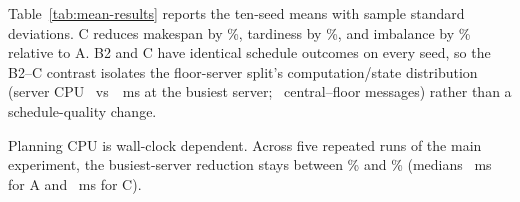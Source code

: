 Table~\ref{tab:mean-results} reports the ten-seed means with sample standard deviations. C reduces makespan by \RedMakespanCAabs\%, tardiness by \RedTardinessCAabs\%, and imbalance by \RedImbalanceCAabs\% relative to A. B2 and C have identical schedule outcomes on every seed, so the B2--C contrast isolates the floor-server split's computation/state distribution (server CPU \CpuMaxC~vs~\CpuMaxBtwo~ms at the busiest server; \MessagesC~central--floor messages) rather than a schedule-quality change.

\begin{table}[t]
\centering
\small
\caption{Mean $\pm$ sample standard deviation over ten seeds (100 jobs, 20 AGVs). Percentages compare C with A. B2 and C have identical schedule outcomes on every seed, so B2 is omitted from the columns.}
\label{tab:mean-results}
\end{table}

Planning CPU is wall-clock dependent. Across five repeated runs of the main experiment, the busiest-server reduction stays between \CpuRepeatRedMin\% and \CpuRepeatRedMax\% (medians \CpuRepeatMedianA~ms for A and \CpuRepeatMedianC~ms for C).

